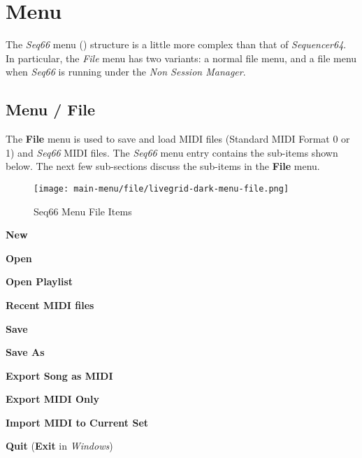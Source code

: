 %
%
%

\section{Menu}
\label{sec:seq66_menu}

   The \textsl{Seq66} menu
   () structure is a little more complex than
   that of \textsl{Sequencer64}.  In particular, the \textsl{File} menu has two
   variants:  a normal file menu, and a file menu when \textsl{Seq66} is
   running under the \textsl{Non Session Manager}.

\subsection{Menu / File}
\label{subsec:seq66_menu_file}

   The \textbf{File} menu is used to save and load MIDI files
   (Standard MIDI Format 0 or 1) and \textsl{Seq66} MIDI
   files.
   The \textsl{Seq66} menu entry contains the sub-items shown below.
   The next few sub-sections discuss
   the sub-items in the \textbf{File} menu.

\begin{figure}[H]
   \centering 
   \texttt{[image: main-menu/file/livegrid-dark-menu-file.png]}
   \caption{Seq66 Menu File Items}
   \label{fig:seq66_menu_file_items}
\end{figure}

   \begin{enumber}
      \item \textbf{New}
      \item \textbf{Open}
      \item \textbf{Open Playlist}
      \item \textbf{Recent MIDI files}
      \item \textbf{Save}
      \item \textbf{Save As}
      \item \textbf{Export Song as MIDI}
      \item \textbf{Export MIDI Only}
      \item \textbf{Import MIDI to Current Set}
      \item \textbf{Quit} (\textbf{Exit} in \textsl{Windows})
   \end{enumber}

